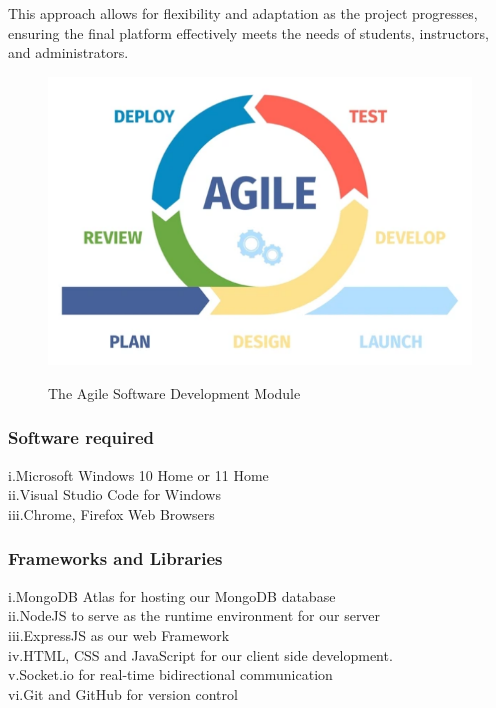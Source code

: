 \documentclass[a4paper,12pt]{article}  %
\begin{document}
This approach allows for flexibility and adaptation as the project progresses,
ensuring the final platform effectively meets the needs of students,
instructors, and administrators.\\

\begin{figure}[H]
  \centering
  \includegraphics[width=1\textwidth]{figures/agile.png}
  \label{fig:1.6.0}
  \caption{The Agile Software Development Module}
\end{figure}

\subsubsection{Software required}
i.Microsoft Windows 10 Home or 11 Home\\ ii.Visual Studio Code for Windows \\
iii.Chrome, Firefox Web Browsers\\

\subsubsection{Frameworks and Libraries}
i.MongoDB Atlas for hosting our MongoDB database\\ ii.NodeJS to serve as the
runtime environment for our server\\ iii.ExpressJS as our web Framework\\
iv.HTML, CSS and JavaScript for our client side development.\\ v.Socket.io for
real-time bidirectional communication\\ vi.Git and GitHub for version control\\
\end{document}
